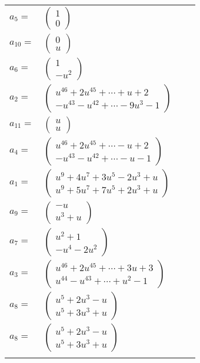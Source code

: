 \documentclass[1p]{elsarticle_modified}
\theoremstyle{definition}
\begin{document}
\begin{tabular}{m{7pt} m{180pt} m{7pt} m{180pt} }
\flushright $a_{5}=$&$\begin{pmatrix}1\\0\end{pmatrix}$ \\
\flushright $a_{10}=$&$\begin{pmatrix}0\\u\end{pmatrix}$ \\
\flushright $a_{6}=$&$\begin{pmatrix}1\\- u^2\end{pmatrix}$ \\
\flushright $a_{2}=$&$\begin{pmatrix}u^{46}+2 u^{45}+\cdots+u+2\\- u^{43}- u^{42}+\cdots-9 u^3-1\end{pmatrix}$ \\
\flushright $a_{11}=$&$\begin{pmatrix}u\\u\end{pmatrix}$ \\
\flushright $a_{4}=$&$\begin{pmatrix}u^{46}+2 u^{45}+\cdots- u+2\\- u^{43}- u^{42}+\cdots- u-1\end{pmatrix}$ \\
\flushright $a_{1}=$&$\begin{pmatrix}u^9+4 u^7+3 u^5-2 u^3+u\\u^9+5 u^7+7 u^5+2 u^3+u\end{pmatrix}$ \\
\flushright $a_{9}=$&$\begin{pmatrix}- u\\u^3+u\end{pmatrix}$ \\
\flushright $a_{7}=$&$\begin{pmatrix}u^2+1\\- u^4-2 u^2\end{pmatrix}$ \\
\flushright $a_{3}=$&$\begin{pmatrix}u^{46}+2 u^{45}+\cdots+3 u+3\\u^{44}- u^{43}+\cdots+u^2-1\end{pmatrix}$ \\
\flushright $a_{8}=$&$\begin{pmatrix}u^5+2 u^3- u\\u^5+3 u^3+u\end{pmatrix}$\\ \flushright $a_{8}=$&$\begin{pmatrix}u^5+2 u^3- u\\u^5+3 u^3+u\end{pmatrix}$\\&\end{tabular}
\end{document}
